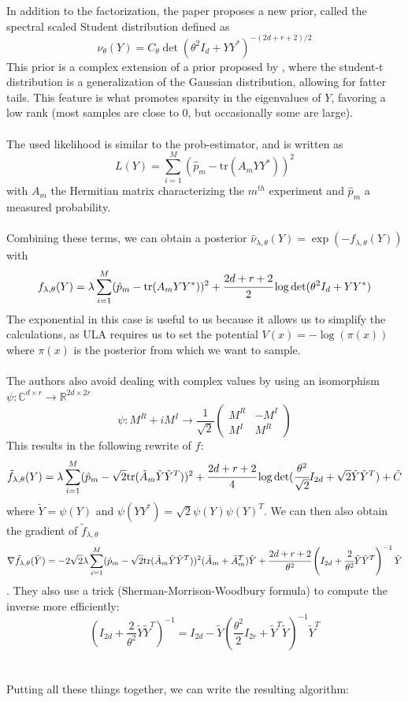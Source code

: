 \documentclass[12pt]{memoir}
\newcommand{\tr}{\text{tr}}
\begin{document}
In addition to the factorization, the paper proposes a new prior, called the spectral scaled Student distribution defined as
\[
\nu_{\theta} (Y) = C_\theta \det(\theta^2I_d + YY^*)^{-(2d+r+2)/2}
\]
This prior is a complex extension of a prior proposed by \cite{Dal20}, where the student-t distribution is a generalization of the Gaussian distribution, allowing for fatter tails. This feature is what promotes sparsity in the eigenvalues of $Y$, favoring a low rank (most samples are close to 0, but occasionally some are large).\\\\
The used likelihood is similar to the prob-estimator, and is written as 
\begin{equation}
L(Y) = \sum^{M}_{i=1} (\hat p_m - \tr(A_mYY^*))^2
\end{equation}
with $A_m$ the Hermitian matrix characterizing the $m^{th}$ experiment and $\hat p_m$ a measured probability.\\\\
Combining these terms, we can obtain a posterior $\hat \nu_{\lambda, \theta}(Y) = \exp(-f_{\lambda, \theta}(Y))$ with
\begin{equation}
    f_{\lambda, \theta}(Y) = \lambda \sum^{M}_{i=1} (\hat p_m - \tr(A_mYY^*))^2 + \cfrac{2d + r + 2}{2}\log \det(\theta^2I_d + YY^*)
\end{equation}
The exponential in this case is useful to us because it allows us to simplify the calculations, as ULA requires us to set the potential $V(x) = -\log(\pi(x))$ where $\pi(x)$ is the posterior from which we want to sample.\\\\ 
The authors also avoid dealing with complex values by using an isomorphism $\psi: \mathbb{C}^{d\times r}\rightarrow \mathbb{R}^{2d\times 2r}$
$$
\psi: M^R + iM^I \rightarrow \frac{1}{\sqrt 2} \begin{pmatrix}
    M^R & - M^I\\
    M^I & M^R
\end{pmatrix}
$$
This results in the following rewrite of $f$:
\[
\tilde f_{\lambda, \theta}(Y) = \lambda \sum^{M}_{i=1} (\hat p_m - \sqrt{2}\tr(\tilde A_m \tilde Y \tilde Y^T))^2 + \cfrac{2d + r + 2}{4}\log \det(\cfrac{\theta^2}{\sqrt 2}I_{2d} + \sqrt 2 \tilde Y \tilde Y^T) + \tilde C
\]
where $\tilde Y = \psi(Y)$ and $\psi(YY^*) = \sqrt{2} \psi(Y)\psi(Y)^T$. We can then also obtain the gradient of $\tilde f_{\lambda, \theta}$
\[
\nabla \tilde f_{\lambda, \theta}(\tilde Y) = -2\sqrt 2 \lambda \sum^{M}_{i=1} (\hat p_m - \sqrt{2}\tr(\tilde A_m \tilde Y \tilde Y^T))^2 (\tilde A_m + \tilde A^T_m)\tilde Y + \cfrac{2d + r + 2}{\theta^2} \left(I_{2d} + \cfrac{2}{\theta^2}\tilde Y \tilde Y^T\right)^{-1} \tilde Y
\]. They also use a trick (Sherman-Morrison-Woodbury formula) to compute the inverse more efficiently:
\[
\left( I_{2d} + \frac{2}{\theta^2} \tilde Y \tilde Y^T \right)^{-1} =  I_{2d} - \tilde Y \left( \frac{\theta^2}{2} I_{2r}+\tilde Y^T \tilde Y \right)^{-1} \tilde Y^T
\]\\\\
Putting all these things together, we can write the resulting algorithm:
\end{document}
